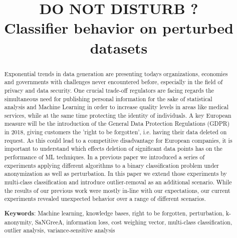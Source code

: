 \documentclass{llncs}
\begin{document}
\title{DO NOT DISTURB ? \\ Classifier behavior on perturbed datasets}


	
\maketitle

\begin{abstract}

Exponential trends in data generation are presenting todays organizations, economies and governments with challenges never encountered before, especially in the field of privacy and data security. One crucial trade-off regulators are facing regards the simultaneous need for publishing personal information for the sake of statistical analysis and Machine Learning in order to increase quality levels in areas like medical services, while at the same time protecting the identity of individuals. A key European measure will be the introduction of the General Data Protection Regulations (GDPR) in 2018, giving customers the 'right to be forgotten', i.e. having their data deleted on request. As this could lead to a competitive disadvantage for European companies, it is important to understand which effects deletion of significant data points has on the performance of ML techniques. In a previous paper we introduced a series of experiments applying different algorithms to a binary classification problem under anonymization as well as perturbation. In this paper we extend those experiments by multi-class classification and introduce outlier-removal as an additional scenario. While the results of our previous work were mostly in-line with our expectations, our current experiments revealed unexpected behavior over a range of different scenarios.


\medskip

\textbf{Keywords}: Machine learning, knowledge bases, right to be forgotten, perturbation, k-anonymity, SaNGreeA, information loss, cost weighing vector, multi-class classification, outlier analysis, variance-sensitive analysis


\end{abstract}
\end{document}
